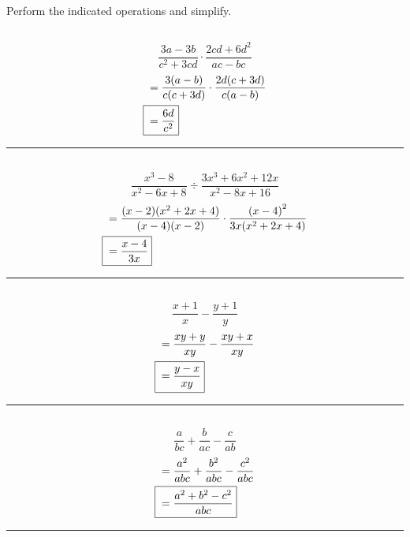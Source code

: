 


\section{}
	Perform the indicated operations and simplify.

	\subsection{}
		\[\frac{3a - 3b}{c^2 + 3cd} \cdot \frac{2cd + 6d^2}{ac - bc}\]
		\begin{align*}
			&= \frac{3(a - b)}{c(c + 3d)} \cdot \frac{2d(c + 3d)}{c(a - b)} \\
			\Aboxed{{} &= \frac{6d}{c^2}}
		\end{align*}
		\hrule{}

	\subsection{}
		\[\frac{x^3 - 8}{x^2 - 6x + 8} \div \frac{3x^3 + 6x^2 + 12x}{x^2 - 8x + 16}\]
		\begin{align*}
			&= \frac{(x - 2)(x^2 + 2x + 4)}{(x - 4)(x - 2)} \cdot \frac{{(x - 4)}^2}{3x(x^2 + 2x + 4)} \\
			\Aboxed{{} &= \frac{x - 4}{3x}}
		\end{align*}
		\hrule{}

	\subsection{}
		\[\frac{x + 1}{x} - \frac{y + 1}{y}\]
		\begin{align*}
			&= \frac{xy + y}{xy} - \frac{xy + x}{xy} \\
			\Aboxed{{} &= \frac{y - x}{xy}}
		\end{align*}
		\hrule{}

	\subsection{}
		\[\frac{a}{bc} + \frac{b}{ac} - \frac{c}{ab}\]
		\begin{align*}
			&= \frac{a^2}{abc} + \frac{b^2}{abc} - \frac{c^2}{abc} \\
			\Aboxed{{} &= \frac{a^2 + b^2 - c^2}{abc}}
		\end{align*}
		\hrule{}

